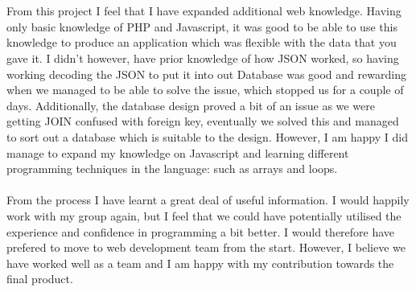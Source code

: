 \documentclass[12pt, portrait]{article}
\begin{document}
~\\\\
From this project I feel that I have expanded additional web knowledge. Having only basic knowledge of PHP and Javascript, it was good to be able to use this knowledge to produce an application which was flexible with the data that you gave it. I didn't however, have prior knowledge of how JSON worked, so having working decoding the JSON to put it into out Database was good and rewarding when we managed to be able to solve the issue, which stopped us for a couple of days. Additionally, the database design proved a bit of an issue as we were getting JOIN confused with foreign key, eventually we solved this and managed to sort out a database which is suitable to the design. However, I am happy I did manage to expand my knowledge on Javascript and learning different programming techniques in the language: such as arrays and loops.
~\\\\
From the process I have learnt a great deal of useful information. I would happily work with my group again, but I feel that we could have potentially utilised the experience and confidence in programming a bit better. I would therefore have prefered to move to web development team from the start. However, I believe we have worked well as a team and I am happy with my contribution towards the final product.
\end{document}
